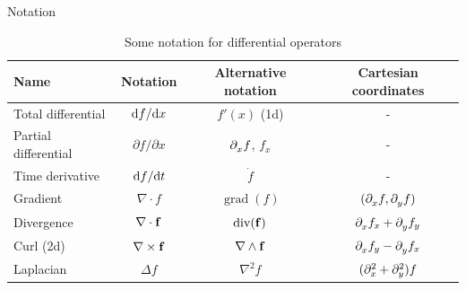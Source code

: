\begin{frame}{Notation}
	\begin{table}
		\caption{Some notation for differential operators}
		\begin{tabular}{lccc}
			\toprule
			Name & Notation & Alternative notation & Cartesian coordinates \\
			\midrule
			Total differential & $ \diff f/\diff x $ & $ f'(x) $ (1d) & - \\
			Partial differential & $ \partial f/\partial x $ & $ \pp{x} f $, $ f_x $ & -\\
			Time derivative & $ \diff f/\diff t $ & $ \dot{f} $ & - \\
			Gradient & $ \nabla \cdot f $ & $ \operatorname{grad}(f) $ & $ (\pp{x}f,\pp{y}f) $ \\
			Divergence & $ \nabla \cdot \fone $ & $ \operatorname{div}(\fone) $ & $ \pp{x} f_x + \pp{y} f_y $ \\
			Curl (2d) & $ \nabla \times \fone $ & $ \nabla \wedge \fone $ & $ \pp{x}f_y - \pp{y} f_x $ \\
			Laplacian & $ \Delta f$ & $ \nabla^2 f $ &  $ (\pp[2]{x} + \pp[2]{y})f $ \\
			\bottomrule		
		\end{tabular}
	\end{table}
\end{frame}


